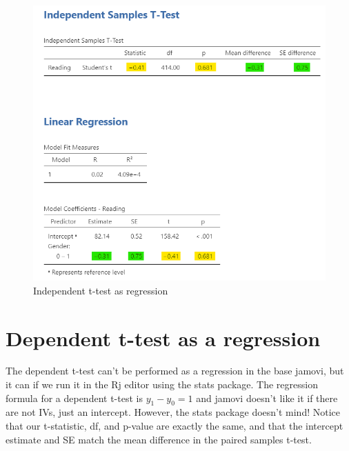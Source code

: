\documentclass[
]{book}
\begin{document}
\begin{figure}

{\centering \includegraphics[width=1\linewidth]{images/14-regression-wrap-up/t-test} 

}

\caption{Independent t-test as regression}\label{fig:unnamed-chunk-2}
\end{figure}

\hypertarget{dependent-t-test-as-a-regression}{%
\section{Dependent t-test as a regression}\label{dependent-t-test-as-a-regression}}

The dependent t-test can't be performed as a regression in the base jamovi, but it can if we run it in the Rj editor using the stats package. The regression formula for a dependent t-test is \(y_1 -y_0 = 1\) and jamovi doesn't like it if there are not IVs, just an intercept. However, the stats package doesn't mind! Notice that our t-statistic, df, and p-value are exactly the same, and that the intercept estimate and SE match the mean difference in the paired samples t-test.
\end{document}
